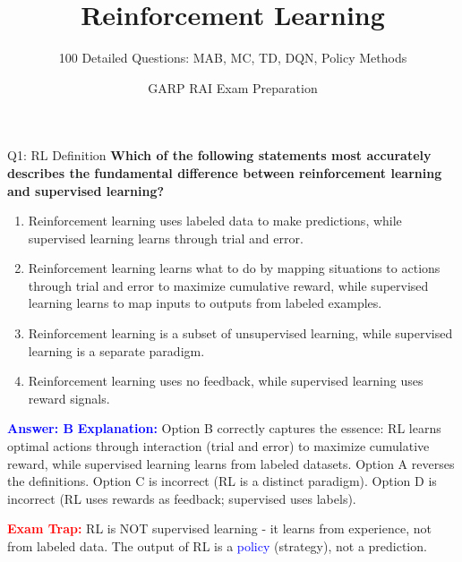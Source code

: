 \documentclass[8pt]{beamer}
\title{Reinforcement Learning}
\subtitle{100 Detailed Questions: MAB, MC, TD, DQN, Policy Methods}
\author{GARP RAI Exam Preparation}
\date{}
\begin{document}
	
	\begin{frame}
		\titlepage
	\end{frame}
	
	
	\begin{frame}{Q1: RL Definition}
		\fontsize{6.5}{7.5}\selectfont
		\textbf{Which of the following statements most accurately describes the fundamental difference between reinforcement learning and supervised learning?}
		
		\begin{enumerate}
			\item Reinforcement learning uses labeled data to make predictions, while supervised learning learns through trial and error.
			\item Reinforcement learning learns what to do by mapping situations to actions through trial and error to maximize cumulative reward, while supervised learning learns to map inputs to outputs from labeled examples.
			\item Reinforcement learning is a subset of unsupervised learning, while supervised learning is a separate paradigm.
			\item Reinforcement learning uses no feedback, while supervised learning uses reward signals.
		\end{enumerate}
		
		\vspace{0.1cm}
		\textcolor{blue}{\textbf{Answer: B}}
		\vspace{0.1cm}
		\textcolor{blue}{\textbf{Explanation:}} Option B correctly captures the essence: RL learns optimal actions through interaction (trial and error) to maximize cumulative reward, while supervised learning learns from labeled datasets. Option A reverses the definitions. Option C is incorrect (RL is a distinct paradigm). Option D is incorrect (RL uses rewards as feedback; supervised uses labels).
		
		\textcolor{red}{\textbf{Exam Trap:}} RL is NOT supervised learning - it learns from experience, not from labeled data. The output of RL is a \textcolor{blue}{policy} (strategy), not a prediction.
	\end{frame}
	
\end{document}

